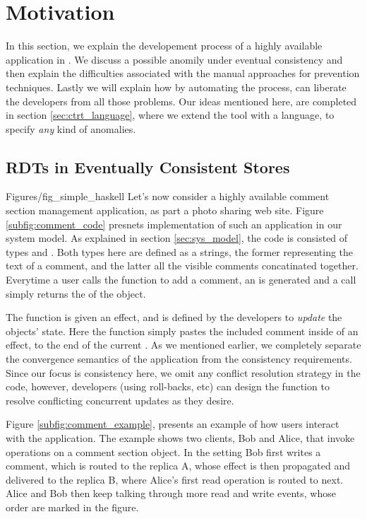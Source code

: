 \newpage
\section{Motivation}
\label {sec:motiv}
In this section, we explain the developement process of a highly
available application in \tool. We discuss a possible  anomily under
eventual consistency and then explain the difficulties associated 
with the manual approaches for prevention techniques.
Lastly we will explain how by automating the process, \tool can liberate
the developers from all those problems.
Our ideas mentioned here, are completed in  section
\ref{sec:ctrt_language}, where we extend the tool with a language, to
specify \emph{any} kind of anomalies. 


%
%
\subsection{RDTs in Eventually Consistent Stores }
 {Figures/fig_simple_haskell}
Let's now consider a highly available comment
section management application, as part a photo sharing web site.
Figure \ref{subfig:comment_code} presnets implementation of such an application
in our system model. As explained in section \ref{sec:sys_model}, the
code is consisted of types \effectC{} and \stateC{}. Both types here are
defined as a strings, the former representing the text of a comment, and
the latter all the visible comments concatinated together.
Everytime a user calls the \writeC{} function to add a comment, an
\effectC{}
is generated and a \readC{} call simply
returns the \stateC{} of the object.

The \applyC{} function is given an effect, and is defined by the
developers to \emph{update} the objects' state.
Here the \applyC{} function simply pastes the 
included comment inside of  an effect, to the end of the current \stateC{}. As we mentioned earlier, we
completely separate the convergence semantics of the application  from the consistency
requirements. Since our focus is consistency here, we omit any conflict
resolution strategy in the code, however, developers (using roll-backs,
etc) can design the \applyC{} function to resolve conflicting
concurrent updates as they desire. 

Figure \ref{subfig:comment_example}, presents an example of how users
interact with the application. The example shows two clients, Bob and
Alice, that invoke operations on a comment section object. In the
setting Bob first writes a comment, which is routed to the replica A,
whose effect is then propagated and delivered to the replica B, where Alice's
first read operation is routed to next. Alice and Bob then keep talking
through more read and write events, whose order are marked in the
figure. 

